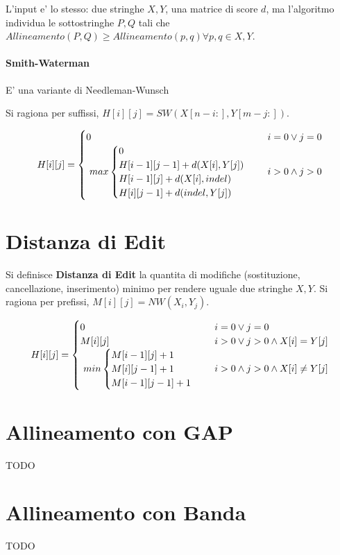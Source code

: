 L'input e' lo stesso: due stringhe $X, Y$, una matrice di score $d$, ma l'algoritmo individua le sottostringhe $P, Q$ tali che $Allineamento(P, Q) \geq Allineamento(p, q) \forall p,q \in X, Y$.

\paragraph{Smith-Waterman}
E' una variante di Needleman-Wunsch

Si ragiona per suffissi, $H[i][j] = SW(X[n-i:], Y[m-j:])$.

\[
    H[i][j] =
    \begin{cases}
        \text{$0$} & \text{$i = 0 \lor j = 0$} \\
        \text{
            $
                max 
                \begin{cases}
                    0 \\
                    H[i-1][j-1] + d(X[i], Y[j]) \\
                    H[i-1][j] + d(X[i], indel) \\
                    H[i][j-1] + d(indel, Y[j]) \\
                \end{cases}
            $
        } & \text{$i > 0 \land j > 0$}
    \end{cases}
\]

\section{Distanza di Edit}

Si definisce \textbf{Distanza di Edit} la quantita di modifiche (sostituzione, cancellazione, inserimento) minimo per rendere uguale due stringhe $X,Y$.
Si ragiona per prefissi, $M[i][j] = NW(X_i, Y_j)$.

\[
    H[i][j] =
    \begin{cases}
        \text{$0$} & \text{$i = 0 \lor j = 0$} \\
        \text{$M[i][j]$} & \text{$i > 0 \lor j > 0 \land X[i] = Y[j]$} \\
        \text{
            $
                min
                \begin{cases}
                    M[i-1][j] + 1 \\
                    M[i][j-1] + 1 \\
                    M[i-1][j-1] + 1 \\
                \end{cases}
            $
        } & \text{$i > 0 \land j > 0 \land X[i] \neq Y[j]$}
    \end{cases}
\]

\section{Allineamento con GAP}

TODO

\section{Allineamento con Banda}

TODO